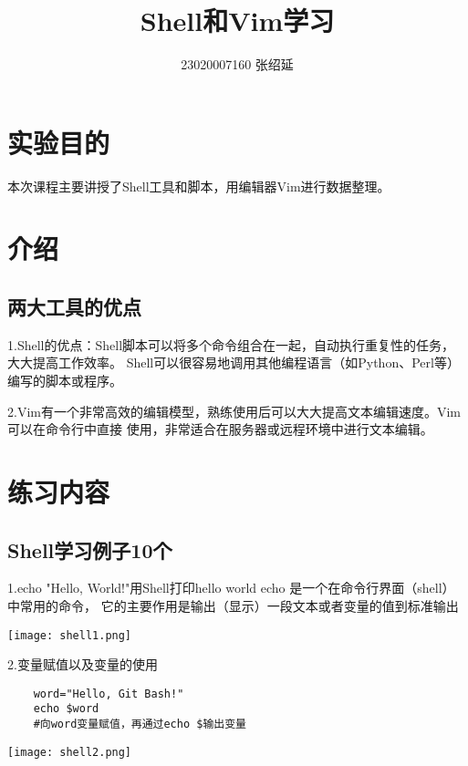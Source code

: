 \documentclass{article}
\title{Shell和Vim学习}
\author{23020007160  张绍延}
\begin{document}
\maketitle

\section{实验目的}
本次课程主要讲授了Shell工具和脚本，用编辑器Vim进行数据整理。

\section{介绍}
\subsection{两大工具的优点}
1.Shell的优点：Shell脚本可以将多个命令组合在一起，自动执行重复性的任务，大大提高工作效率。
Shell可以很容易地调用其他编程语言（如Python、Perl等）编写的脚本或程序。

2.Vim有一个非常高效的编辑模型，熟练使用后可以大大提高文本编辑速度。Vim可以在命令行中直接
使用，非常适合在服务器或远程环境中进行文本编辑。
\section{练习内容}
\subsection{Shell学习例子10个}

1.echo "Hello, World!"用Shell打印hello world
echo 是一个在命令行界面（shell）中常用的命令，
它的主要作用是输出（显示）一段文本或者变量的值到标准输出

\noindent
\begin{minipage}{\linewidth}
  \centering
  \texttt{[image: shell1.png]}
  \label{fig:example}
\end{minipage}


2.变量赋值以及变量的使用
\begin{verbatim}
    word="Hello, Git Bash!"
    echo $word
    #向word变量赋值，再通过echo $输出变量
 \end{verbatim}


\noindent
\begin{minipage}{\linewidth}
  \centering
  \texttt{[image: shell2.png]}
  \label{fig:example}
\end{minipage}
\end{document}
